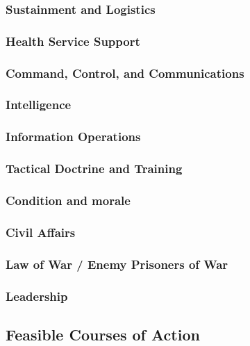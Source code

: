 \subsubsection{Sustainment and Logistics}

\subsubsection{Health Service Support}

\subsubsection{Command, Control, and Communications}

\subsubsection{Intelligence}

\subsubsection{Information Operations}

\subsubsection{Tactical Doctrine and Training}

\subsubsection{Condition and morale}

\subsubsection{Civil Affairs}

\subsubsection{Law of War / Enemy Prisoners of War}

\subsubsection{Leadership}

\subsection{Feasible Courses of Action}

